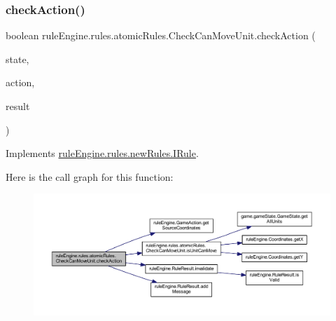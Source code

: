 \subsubsection{\texorpdfstring{check\+Action()}{checkAction()}}
{\footnotesize\ttfamily boolean rule\+Engine.\+rules.\+atomic\+Rules.\+Check\+Can\+Move\+Unit.\+check\+Action (\begin{DoxyParamCaption}\item[{\mbox{\hyperlink{classgame_1_1game_state_1_1_game_state}{Game\+State}}}]{state,  }\item[{\mbox{\hyperlink{classrule_engine_1_1_game_action}{Game\+Action}}}]{action,  }\item[{\mbox{\hyperlink{classrule_engine_1_1_rule_result}{Rule\+Result}}}]{result }\end{DoxyParamCaption})\hspace{0.3cm}{\ttfamily [inline]}}



Implements \mbox{\hyperlink{interfacerule_engine_1_1rules_1_1new_rules_1_1_i_rule_a72ce29a47d7a5fba75a09444a50a481e}{rule\+Engine.\+rules.\+new\+Rules.\+I\+Rule}}.

Here is the call graph for this function\+:
\nopagebreak
\begin{figure}[H]
\begin{center}
\leavevmode
\includegraphics[width=350pt]{classrule_engine_1_1rules_1_1atomic_rules_1_1_check_can_move_unit_a32b0bde0deb256a30ca98f9fb393def0_cgraph}
\end{center}
\end{figure}
\mbox{\label{classrule_engine_1_1rules_1_1atomic_rules_1_1_check_can_move_unit_aecbc116d3a1af14548f7aa75533b23be}} 
